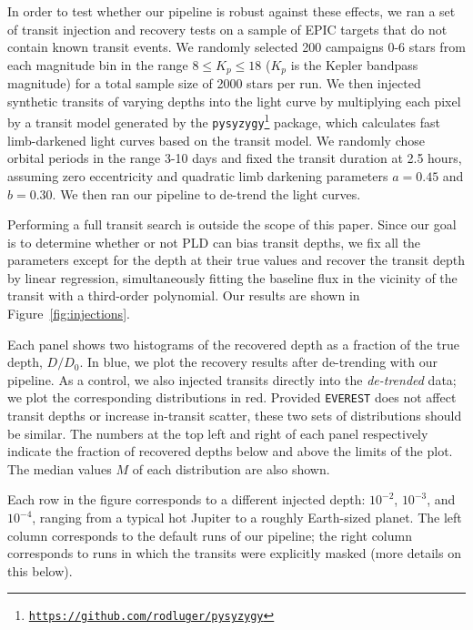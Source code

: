 \documentclass[]{emulateapj}
\begin{document}
In order to test whether our pipeline is robust against these effects, we ran a set
of transit injection and recovery tests on a sample of EPIC
targets that do not contain known transit events. We randomly selected 200 campaigns 0-6 stars 
from each magnitude bin in the range $8 \le K_p \le 18$ ($K_p$ is the Kepler bandpass magnitude)
for a total sample size of 2000 stars per run. We then injected synthetic transits of varying depths into the
light curve by multiplying each pixel by a transit model generated by the 
\texttt{pysyzygy}\footnote{\texttt{\url{https://github.com/rodluger/pysyzygy}}}
package, which calculates fast limb-darkened light curves based on the \cite{MA02} transit model. 
We randomly chose orbital periods in the range 3-10 days and fixed
the transit duration at 2.5 hours, assuming zero eccentricity
and quadratic limb darkening parameters $a = 0.45$ and $b = 0.30$. We then
ran our pipeline to de-trend the light curves.

Performing a full transit search is outside the scope of this paper. Since our 
goal is to determine whether or not PLD can bias transit depths, we fix all the
parameters except for the depth at their true values and recover the transit
depth by linear regression, simultaneously fitting the baseline flux in the
vicinity of the transit with a third-order polynomial. Our results are shown
in Figure~\ref{fig:injections}.

Each panel shows two histograms of the recovered depth as a fraction of the true
depth, $D/D_0$. In blue, we plot the recovery results after de-trending with our pipeline.
As a control, we also injected transits directly into the \emph{de-trended} data; we 
plot the corresponding distributions in red. Provided \texttt{EVEREST} does not affect
transit depths or increase in-transit scatter, these two sets of distributions should 
be similar. The numbers at the top left and right of each
panel respectively indicate the fraction of recovered depths below and above the limits 
of the plot. The median values $M$ of each distribution are also shown.

Each row in the figure corresponds to a different injected depth: 
$10^{-2}$, $10^{-3}$, and $10^{-4}$, ranging from a typical 
hot Jupiter to a roughly Earth-sized planet. The left column corresponds to the default
runs of our pipeline; the right column corresponds to runs in which the transits were
explicitly masked (more details on this below).
\end{document}
